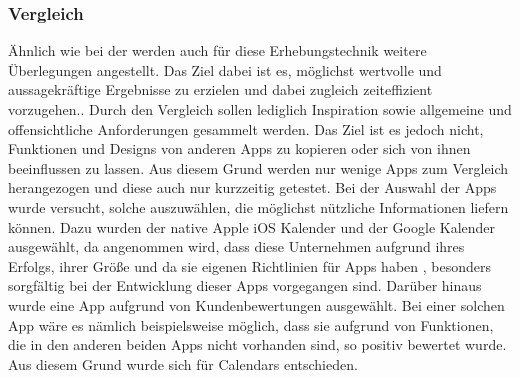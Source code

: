 \subsubsection{Vergleich} %
Ähnlich wie bei der  werden auch für diese Erhebungstechnik weitere Überlegungen angestellt. Das Ziel dabei ist es, möglichst wertvolle und aussagekräftige Ergebnisse zu erzielen und dabei zugleich zeiteffizient vorzugehen..%
%
%
\newline%
\myNewSection%
Durch den Vergleich sollen lediglich Inspiration sowie allgemeine und offensichtliche Anforderungen gesammelt werden. %
Das Ziel ist es jedoch nicht, Funktionen und Designs von anderen Apps zu kopieren oder sich von ihnen beeinflussen zu lassen. %
	Aus diesem Grund werden nur wenige Apps zum Vergleich herangezogen und diese auch nur kurzzeitig getestet.%
\newline%
Bei der Auswahl der Apps wurde versucht, solche auszuwählen, die möglichst nützliche Informationen liefern können. %
	Dazu wurden der native Apple iOS Kalender\cite{A_calendarApple} und der Google Kalender\cite{A_calendarGoogle} ausgewählt, da angenommen wird, dass diese Unternehmen aufgrund ihres Erfolgs, ihrer Größe und da sie eigenen Richtlinien für Apps haben \cite{konventionen_guidelinesApple, konventionen_guidelinesGoogle}, besonders sorgfältig bei der Entwicklung dieser Apps vorgegangen sind.\newline%
	Darüber hinaus wurde eine App aufgrund von Kundenbewertungen ausgewählt. Bei einer solchen App wäre es nämlich beispielsweise möglich, dass sie aufgrund von Funktionen, die in den anderen beiden Apps nicht vorhanden sind, so positiv bewertet wurde. Aus diesem Grund wurde sich für Calendars\cite{A_calendarReviews} entschieden.%